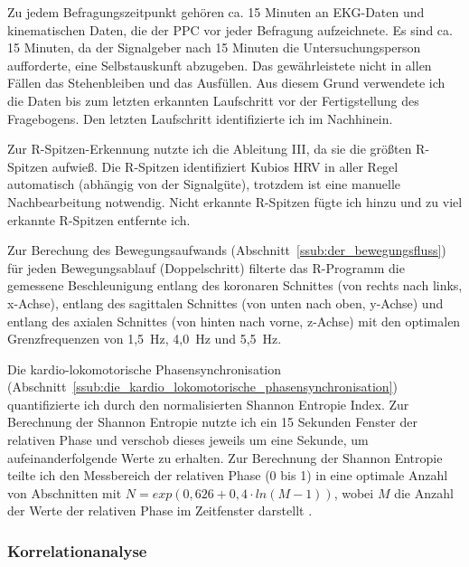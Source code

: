 Zu jedem Befragungszeitpunkt gehören ca. 15 Minuten an \ac{EKG}-Daten und kinematischen Daten, die der \ac{PPC} vor jeder Befragung aufzeichnete. Es sind ca. 15 Minuten, da der Signalgeber nach 15 Minuten die Untersuchungsperson aufforderte, eine Selbstauskunft abzugeben. Das gewährleistete nicht in allen Fällen das Stehenbleiben und das Ausfüllen. Aus diesem Grund verwendete ich die Daten bis zum letzten erkannten Laufschritt vor der Fertigstellung des Fragebogens. Den letzten Laufschritt identifizierte ich im Nachhinein. 

Zur R-Spitzen-Erkennung nutzte ich die Ableitung III, da sie die größten R-Spitzen aufwieß. Die R-Spitzen identifiziert Kubios HRV in aller Regel automatisch (abhängig von der Signalgüte), trotzdem ist eine manuelle Nachbearbeitung notwendig. Nicht erkannte R-Spitzen fügte ich hinzu und zu viel erkannte R-Spitzen entfernte ich. 

Zur Berechung des Bewegungsaufwands (Abschnitt~\ref{ssub:der_bewegungsfluss}) für jeden Bewegungsablauf (Doppelschritt) filterte das R-Programm die gemessene Beschleunigung entlang des koronaren Schnittes (von rechts nach links, x-Achse), entlang des sagittalen Schnittes (von unten nach oben, y-Achse) und entlang des axialen Schnittes (von hinten nach vorne, z-Achse) mit den optimalen Grenzfrequenzen von 1,5~Hz, 4,0~Hz und 5,5~Hz.

Die kardio-lokomotorische Phasensynchronisation (Abschnitt~\ref{ssub:die_kardio_lokomotorische_phasensynchronisation}) quantifizierte ich durch den normalisierten Shannon Entropie Index. Zur Berechnung der Shannon Entropie nutzte ich ein 15 Sekunden Fenster der relativen Phase und verschob dieses jeweils um eine Sekunde, um aufeinanderfolgende Werte zu erhalten. Zur Berechnung der Shannon Entropie teilte ich den Messbereich der relativen Phase (0 bis 1) in eine optimale Anzahl von Abschnitten mit $N = exp(0{,}626 + 0{,}4 \cdot ln(M-1))$, wobei $M$ die Anzahl der Werte der relativen Phase im Zeitfenster darstellt \citep[][S.~20]{Rosenblum2003}.

\subsubsection{Korrelationanalyse} 

\label{subs:korrelationanalyse}

